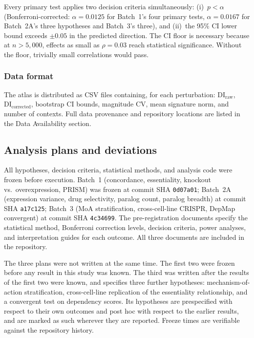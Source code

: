 \documentclass[11pt]{article}
\begin{document}
Every primary test applies two decision criteria simultaneously:
(i)~$p < \alpha$ (Bonferroni-corrected: $\alpha = 0.0125$ for Batch~1's
four primary tests, $\alpha = 0.0167$ for Batch~2A's three hypotheses
and Batch~3's three), and (ii)~the 95\% CI lower bound
exceeds $\pm 0.05$ in the predicted direction.  The CI floor is
necessary because at $n > 5{,}000$, effects as small as
$\rho = 0.03$ reach statistical significance.  Without the floor,
trivially small correlations would pass.

\subsubsection*{Data format}

The atlas is distributed as CSV files containing, for each perturbation:
$\mathrm{DI}_{\mathrm{raw}}$, $\mathrm{DI}_{\mathrm{corrected}}$,
bootstrap CI bounds, magnitude CV, mean signature norm, and number of
contexts.  Full data provenance and repository locations are listed in
the Data Availability section.


\subsection*{Analysis plans and deviations}
\label{sec:integrity}

All hypotheses, decision criteria, statistical methods, and analysis
code were frozen before execution.  Batch~1
(concordance, essentiality, knockout vs.\ overexpression, PRISM) was
frozen at commit SHA \texttt{0d07a01}; Batch~2A (expression variance,
drug selectivity, paralog count, paralog breadth) at commit SHA
\texttt{a17c125}; Batch~3 (MoA stratification, cross-cell-line CRISPR,
DepMap convergent) at commit SHA \texttt{4c34699}.  The pre-registration
documents specify the statistical method, Bonferroni correction levels,
decision criteria, power analyses, and interpretation guides for each
outcome.  All three documents are included in the repository.

The three plans were not written at the same time.  The first two were frozen
before any result in this study was known.  The third was written after the
results of the first two were known, and specifies three further hypotheses:
mechanism-of-action stratification, cross-cell-line replication of the
essentiality relationship, and a convergent test on dependency scores.  Its
hypotheses are prespecified with respect to their own outcomes and post hoc
with respect to the earlier results, and are marked as such wherever they are
reported.  Freeze times are verifiable against the repository history.
\end{document}
